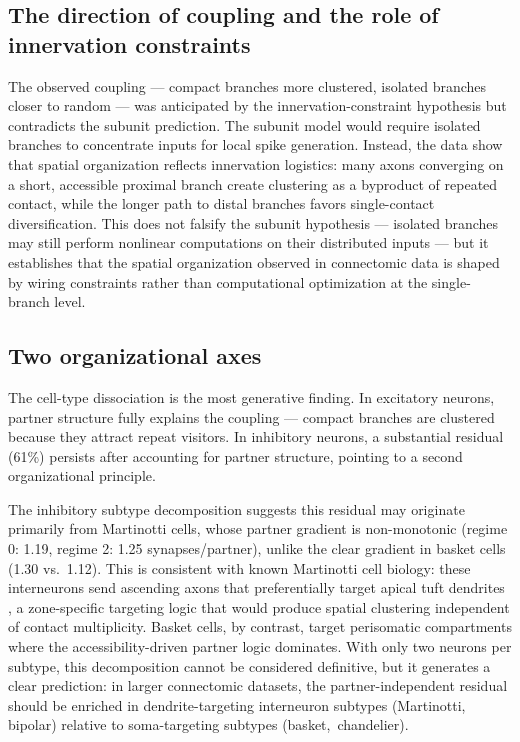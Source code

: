 \documentclass[11pt]{article}
\begin{document}
\subsection{The direction of coupling and the role of innervation constraints}

The observed coupling --- compact branches more clustered, isolated branches closer to random --- was anticipated by the innervation-constraint hypothesis but contradicts the subunit prediction. The subunit model \citep{polsky2004, poirazi2003} would require isolated branches to concentrate inputs for local spike generation. Instead, the data show that spatial organization reflects innervation logistics: many axons converging on a short, accessible proximal branch create clustering as a byproduct of repeated contact, while the longer path to distal branches favors single-contact diversification. This does not falsify the subunit hypothesis --- isolated branches may still perform nonlinear computations on their distributed inputs --- but it establishes that the spatial organization observed in connectomic data is shaped by wiring constraints rather than computational optimization at the single-branch level.

\subsection{Two organizational axes}
\label{sec:two_axes}

The cell-type dissociation is the most generative finding. In excitatory neurons, partner structure fully explains the coupling --- compact branches are clustered because they attract repeat visitors. In inhibitory neurons, a substantial residual (61\%) persists after accounting for partner structure, pointing to a second organizational principle.

The inhibitory subtype decomposition suggests this residual may originate primarily from Martinotti cells, whose partner gradient is non-monotonic (regime 0: 1.19, regime 2: 1.25 synapses/partner), unlike the clear gradient in basket cells (1.30 vs.\ 1.12). This is consistent with known Martinotti cell biology: these interneurons send ascending axons that preferentially target apical tuft dendrites \citep{larkum2009}, a zone-specific targeting logic that would produce spatial clustering independent of contact multiplicity. Basket cells, by contrast, target perisomatic compartments where the accessibility-driven partner logic dominates. With only two neurons per subtype, this decomposition cannot be considered definitive, but it generates a clear prediction: in larger connectomic datasets, the partner-independent residual should be enriched in dendrite-targeting interneuron subtypes (Martinotti, bipolar) relative to soma-targeting subtypes (basket,~chandelier).
\end{document}
